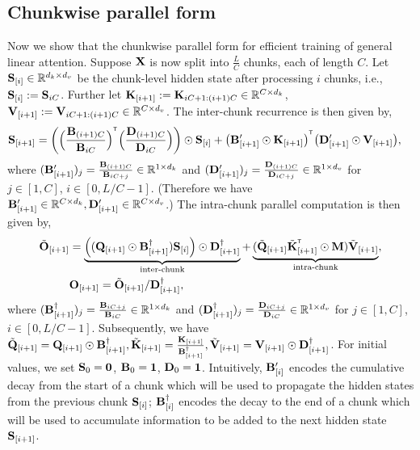 %

%
%
%
%
%
%
%
%
%
%
%
%


\subsection{Chunkwise parallel form}

Now we show that the chunkwise parallel form for efficient training of general linear attention. Suppose ${\mathbf{X}}$ is now split into $\frac{L}{C}$ chunks, each of length $C$. Let ${\mathbf{S}}_{[i]} \in \mathbb{R}^{d_k \times d_v}$ be the chunk-level hidden state after processing $i$ chunks, i.e., ${\mathbf{S}}_{[i]}:={\mathbf{S}}_{iC}$. Further let ${\mathbf{K}}_{[i+1]}:={\mathbf{K}}_{iC+1:(i+1)C} \in \mathbb{R}^{C\times d_k}$, ${\mathbf{V}}_{[i+1]}:={\mathbf{V}}_{iC+1:(i+1)C} \in \mathbb{R}^{C\times d_v}$. The inter-chunk recurrence is then given by,
\begin{align*}
\rmS_{[i+1]} 
&= \left(\Big(\frac{\rmB_{(i+1)C}}{\rmB_{iC}}\Big)^{\intercal}\Big(\frac{\rmD_{(i+1)C}}{\rmD_{iC}}\Big) \right) \odot \rmS_{[i]} +  \big(\rmB^{\prime}_{[i+1]} \odot \rmK_{[i+1]}\big)^{\intercal} \big(\rmD^{\prime}_{[i+1]} \odot \rmV_{[i+1]}\big),
\label{eq:gla_inter_chunk_recur}
\end{align*}
 where $({\mathbf{B}}^{\prime}_{[i+1]})_j = \frac{{\mathbf{B}}_{(i+1)C}}{{\mathbf{B}}_{iC+j}} \in \mathbb{R}^{1\times d_k}$ and $({\mathbf{D}}^{\prime}_{[i+1]})_j = \frac{{\mathbf{D}}_{(i+1)C}}{{\mathbf{D}}_{iC+j}} \in \mathbb{R}^{1\times d_v}$ for $j\in [1, C]$, $i \in [0, L/C-1]$. (Therefore we have ${\mathbf{B}}^{\prime}_{[i+1]} \in \mathbb{R}^{C \times d_k}, {\mathbf{D}}^{\prime}_{[i+1]} \in \mathbb{R}^{C \times d_v}$.) The intra-chunk parallel computation is then given by,
\begin{align}
\tilde \rmO_{[i+1]} &= \underbrace{\left((\rmQ_{[i+1]} \odot \rmB^{\dagger}_{[i+1]}) \rmS_{[i]} \right) \odot \rmD^{\dagger}_{[i+1]}}_{\text{inter-chunk}} + \underbrace{
(\tilde\rmQ_{[i+1]} \tilde\rmK_{[i+1]}^{\intercal} \odot \rmM)\tilde\rmV_{[i+1]}
}_{\text{intra-chunk}}, \\ &\rmO_{[i+1]}  = \tilde \rmO_{[i+1]} / \rmD^{\dagger}_{[i+1]},
\label{eq:gla_inter_intra} 
\end{align}
%
 where $({\mathbf{B}}_{[i+1]}^{\dagger})_j = \frac{{\mathbf{B}}_{iC+j}}{{\mathbf{B}}_{iC}} \in \mathbb{R}^{1\times d_k}$ and $({\mathbf{D}}_{[i+1]}^{\dagger})_j = \frac{{\mathbf{D}}_{iC+j}}{{\mathbf{D}}_{iC}} \in \mathbb{R}^{1\times d_v}$  for $j\in [1, C]$, $i \in [0, L/C-1]$. 
 Subsequently, we have $\tilde{{\mathbf{Q}}}_{[i+1]}={\mathbf{Q}}_{[i+1]} \odot {\mathbf{B}}_{[i+1]}^{\dagger}, \tilde{{\mathbf{K}}}_{[i+1]}=\frac{{\mathbf{K}}_{[i+1]}}{{\mathbf{B}}_{[i+1]}^{\dagger}}, \tilde{{\mathbf{V}}}_{[i+1]}={\mathbf{V}}_{[i+1]} \odot {\mathbf{D}}_{[i+1]}^{\dagger} $. For initial values, we set ${\mathbf{S}}_0 = {\bm{0}}$, ${\mathbf{B}}_0=\mathbf{1}$, ${\mathbf{D}}_0=\mathbf{1}$. Intuitively, ${\mathbf{B}}^{\prime}_{[i]} $ encodes the cumulative decay from the start of a chunk which will be used to propagate the hidden states from the previous chunk ${\mathbf{S}}_{[i]}$;   ${\mathbf{B}}^{\dagger}_{[i]}$ encodes the decay to the end of a chunk which will be used to accumulate information to be added to the next hidden state ${\mathbf{S}}_{[i+1]}$.


